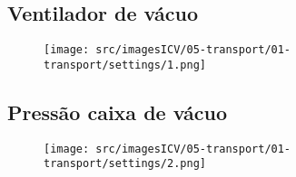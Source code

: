 \thispagestyle{fancy}
\vspace{\fill}
\subsection{Ventilador de vácuo}
\begin{figure}
    \centering
    \texttt{[image: src/imagesICV/05-transport/01-transport/settings/1.png]}
\end{figure}

\newpage
\thispagestyle{fancy}
\vspace{\fill}
\subsection{Pressão caixa de vácuo}
\begin{figure}
    \centering
    \texttt{[image: src/imagesICV/05-transport/01-transport/settings/2.png]}
\end{figure}


